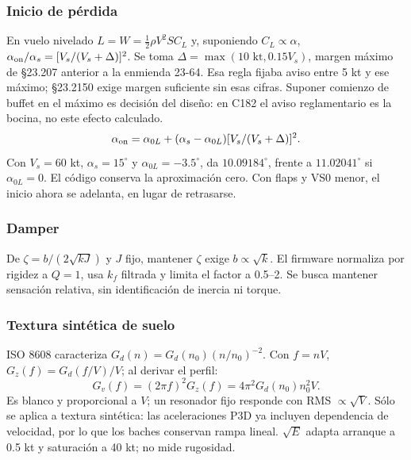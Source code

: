 \subsubsection{Inicio de pérdida}
En vuelo nivelado $L=W=\tfrac12\rho V^2SC_L$ y, suponiendo $C_L\propto\alpha$, $\alpha_{\rm on}/\alpha_s=[V_s/(V_s+\Delta)]^2$. Se toma $\Delta=\max(10\text{ kt},0.15V_s)$, margen máximo de §23.207 \cite{cfr23} anterior a la enmienda 23-64. Esa regla fijaba aviso entre 5 kt y ese máximo; §23.2150 exige margen suficiente sin esas cifras. Suponer comienzo de buffet en el máximo es decisión del diseño: en C182 el aviso reglamentario es la bocina, no este efecto calculado.
\begin{equation}\alpha_{\rm on}=\alpha_{0L}+(\alpha_s-\alpha_{0L})[V_s/(V_s+\Delta)]^2.\end{equation}
Con $V_s=60$ kt, $\alpha_s=15^\circ$ y $\alpha_{0L}=-3.5^\circ$, da $10.09184^\circ$, frente a $11.02041^\circ$ si $\alpha_{0L}=0$. El código conserva la aproximación cero. Con flaps y VS0 menor, el inicio ahora se adelanta, en lugar de retrasarse.



\subsubsection{Damper}
De $\zeta=b/(2\sqrt{kJ})$ y $J$ fijo, mantener $\zeta$ exige $b\propto\sqrt k$. El firmware normaliza por rigidez a $Q=1$, usa $k_f$ filtrada y limita el factor a 0.5--2. Se busca mantener sensación relativa, sin identificación de inercia ni torque.



\subsubsection{Textura sintética de suelo}
ISO 8608 \cite{iso8608} caracteriza $G_d(n)=G_d(n_0)(n/n_0)^{-2}$. Con $f=nV$, $G_z(f)=G_d(f/V)/V$; al derivar el perfil:
\begin{equation}G_v(f)=(2\pi f)^2G_z(f)=4\pi^2G_d(n_0)n_0^2V.\end{equation}
Es blanco y proporcional a $V$; un resonador fijo responde con RMS $\propto\sqrt V$. Sólo se aplica a textura sintética: las aceleraciones P3D ya incluyen dependencia de velocidad, por lo que los baches conservan rampa lineal. $\sqrt E$ adapta arranque a 0.5 kt y saturación a 40 kt; no mide rugosidad.



